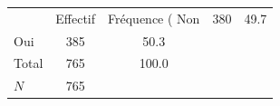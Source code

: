 {
\def\sym#1{\ifmmode^{#1}\else\(^{#1}\)\fi}
\begin{tabular}{l*{1}{cc}}
\toprule
            &    Effectif&Fréquence (%
\midrule
Non         &         380&        49.7\\
Oui         &         385&        50.3\\
Total       &         765&       100.0\\
\midrule
\(N\)       &         765&            \\
\bottomrule
\end{tabular}
}
